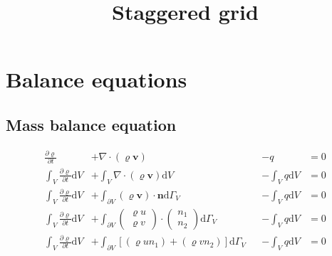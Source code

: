 \documentclass[a4paper,10pt]{scrartcl}
\title{Staggered grid}
\author{}
\begin{document}
\graphicspath{{./pictures/}}

\maketitle


\tableofcontents
\newpage

\section{Balance equations}
\subsection{Mass balance equation}
\begin{equation}
 \begin{alignedat}{3}
 \frac{\partial \varrho}{\partial t} &+ \nabla \cdot (\varrho \textbf{v}) &&- q &= 0 \\[1em]
 \int_{V} \frac{\partial \varrho}{\partial t} \text{d} V &+ \int_{V} \nabla \cdot (\varrho \textbf{v}) \text{d} V &&- \int_{V} q \text{d} V &= 0 \\[1em]
 \int_{V} \frac{\partial \varrho}{\partial t} \text{d} V &+ \int_{\partial V} (\varrho \textbf{v}) \cdot \textbf{n} \text{d} \Gamma_{V} &&- \int_{V} q \text{d} V &= 0 \\[1em]
 \int_{V} \frac{\partial \varrho}{\partial t} \text{d} V &+ \int_{\partial V} \begin{pmatrix}\varrho u \\ \varrho v\end{pmatrix} \cdot \begin{pmatrix}n_1 \\ n_2\end{pmatrix} \text{d} \Gamma_{V}
   &&- \int_{V} q \text{d} V &= 0 \\[1em]
 \int_{V} \frac{\partial \varrho}{\partial t} \text{d} V &+ \int_{\partial V} [(\varrho u n_1) + (\varrho v n_2)] \text{d} \Gamma_{V}
   &&- \int_{V} q \text{d} V &= 0
\end{alignedat}
\end{equation}
\end{document}
